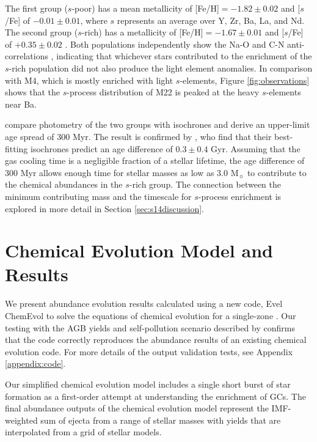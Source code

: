 The first group ($s$-poor) has a mean metallicity of [Fe/H]$=-1.82 \pm 0.02$ and [$s$/Fe] of $-0.01 \pm 0.01$, where $s$ represents an average over Y, Zr, Ba, La, and Nd. The second group ($s$-rich) has a metallicity of [Fe/H]$=-1.67 \pm 0.01$ and [$s$/Fe] of $+0.35 \pm 0.02$ \citep{Marino:2011kz}. Both populations independently show the Na-O and C-N anti-correlations \citep{Marino:2011kz}, indicating that whichever stars contributed to the enrichment of the $s$-rich population did not also produce the light element anomalies. In comparison with M4, which is mostly enriched with light $s$-elements, Figure \ref{fig:observations} shows that the $s$-process distribution of M22 is peaked at the heavy $s$-elements near Ba.

\citet{Marino:2012db} compare photometry of the two groups with isochrones and derive an upper-limit age spread of 300 Myr. The result is confirmed by \citet{Joo:2013dr}, who find that their best-fitting isochrones predict an age difference of $0.3 \pm 0.4$ Gyr. Assuming that the gas cooling time is a negligible fraction of a stellar lifetime, the age difference of 300 Myr allows enough time for stellar masses as low as 3.0 M$_\sun$ to contribute to the chemical abundances in the $s$-rich group. The connection between the minimum contributing mass and the timescale for $s$-process enrichment is explored in more detail in Section \ref{sec:s14discussion}.

\section{Chemical Evolution Model and Results}\label{sec:cemresults}
We present abundance evolution results calculated using a new code, Evel ChemEvol to solve the equations of chemical evolution for a single-zone \citep[for an review, we refer to][]{Pagel:2009ws}. Our testing with the AGB yields and self-pollution scenario described by \citet{Fenner:2004ju} confirms that the code correctly reproduces the abundance results of an existing chemical evolution code. For more details of the output validation tests, see Appendix \ref{appendix:code}.

Our simplified chemical evolution model includes a single short burst of star formation as a first-order attempt at understanding the enrichment of GCs. The final abundance outputs of the chemical evolution model represent the IMF-weighted \citep{Kroupa:1993tm} sum of ejecta from a range of stellar masses with yields that are interpolated from a grid of stellar models.

